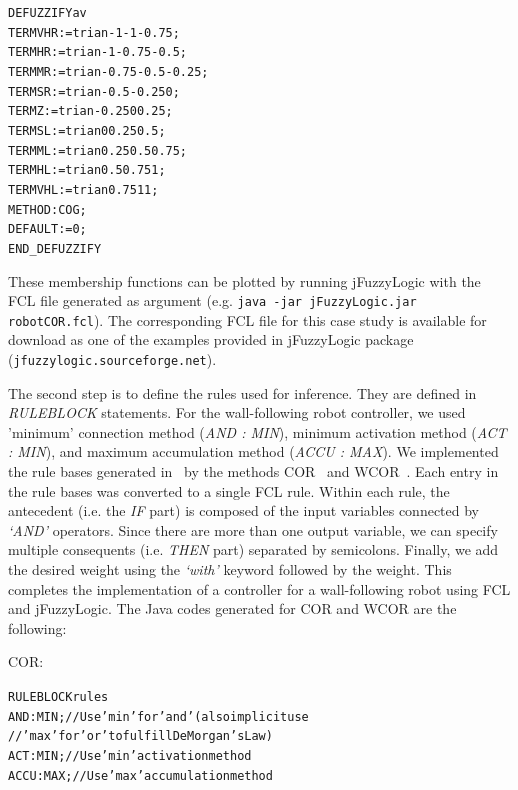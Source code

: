 \documentclass[11pt,twoside]{article}
\begin{document}
\begin{multicols}{2}
\begin{scriptsize}
\begin{alltt}
DEFUZZIFY av
	TERM VHR := trian -1 -1 -0.75;
	TERM HR  := trian -1 -0.75 -0.5;
	TERM MR  := trian -0.75 -0.5 -0.25;
	TERM SR  := trian -0.5 -0.25 0;
	TERM Z   := trian -0.25 0 0.25;
	TERM SL  := trian 0 0.25 0.5;
	TERM ML  := trian 0.25 0.5 0.75;
	TERM HL  := trian 0.5 0.75 1;
	TERM VHL := trian 0.75 1 1;
	METHOD : COG;
	DEFAULT := 0;
END\_DEFUZZIFY
\end{alltt}
\end{scriptsize}

\vspace*{10pt}
These membership functions can be plotted by running jFuzzyLogic with the FCL file generated as argument (e.g. \texttt{java -jar jFuzzyLogic.jar robotCOR.fcl}). 
The corresponding FCL file for this case study is available for download as one of the examples provided in jFuzzyLogic package (\texttt{jfuzzylogic.sourceforge.net}).

The second step is to define the rules used for inference. They are defined in \textit{RULEBLOCK} statements. For the wall-following robot controller, we used 'minimum' connection method (\textit{AND : MIN}), minimum activation method (\textit{ACT : MIN}), and maximum accumulation method (\textit{ACCU : MAX}).  We implemented the rule bases generated in~\cite{mucientes2009learning} by the methods COR~\cite{Casillas02} and WCOR~\cite{Alc06}. Each entry in the rule bases was converted to a single FCL rule. Within each rule, the antecedent (i.e. the \textit{IF} part) is composed of the input variables connected by \textit{`AND'} operators. Since there are more than one output variable, we can specify multiple consequents (i.e. \textit{THEN} part) separated by semicolons. Finally, we add the desired weight using the \textit{`with'} keyword followed by the weight. This completes the implementation of a controller for a wall-following robot using FCL and jFuzzyLogic. The Java codes generated for COR and WCOR are the following:

\vspace*{10pt}
COR:
\begin{scriptsize}
\begin{alltt}
RULEBLOCK rules
AND  : MIN;			// Use 'min' for 'and' (also implicit use 
            //'max' for 'or' to fulfill DeMorgan's Law)
ACT  : MIN;			// Use 'min' activation method
ACCU : MAX;			// Use 'max' accumulation method


\end{alltt}
\end{scriptsize}
\end{multicols}
\end{document}

